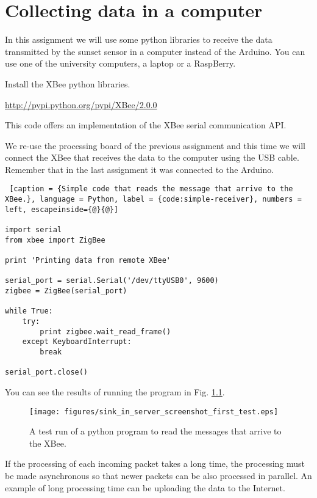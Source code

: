 \chapter{Collecting data in a computer}

In this assignment we will use some python libraries to receive the data transmitted by the sunset sensor in a computer instead of the Arduino.
You can use one of the university computers, a laptop or a RaspBerry.

Install the XBee python libraries.

\url{http://pypi.python.org/pypi/XBee/2.0.0}

This code offers an implementation of the XBee serial communication API.

We re-use the processing board of the previous assignment and this time we will connect the XBee that receives the data to the computer using the USB cable.
Remember that in the last assignment it was connected to the Arduino.

\begin{lstlisting} [caption = {Simple code that reads the message that arrive to the XBee.}, language = Python, label = {code:simple-receiver}, numbers = left, escapeinside={@}{@}]

import serial
from xbee import ZigBee

print 'Printing data from remote XBee'

serial_port = serial.Serial('/dev/ttyUSB0', 9600)
zigbee = ZigBee(serial_port)

while True:
    try:
        print zigbee.wait_read_frame()
    except KeyboardInterrupt:
        break

serial_port.close()
\end{lstlisting}

You can see the results of running the program in Fig. \ref{fig:sink_in_server_screenshot_first_test}.

\begin{figure}[htbp]
  \centering
  \texttt{[image: figures/sink\_in\_server\_screenshot\_first\_test.eps]}
  \caption{A test run of a python program to read the messages that arrive to the XBee.}
  \label{fig:sink_in_server_screenshot_first_test}
\end{figure}

If the processing of each incoming packet takes a long time, the processing must be made asynchronous so that newer packets can be also processed in parallel.
An example of long processing time can be uploading the data to the Internet.

